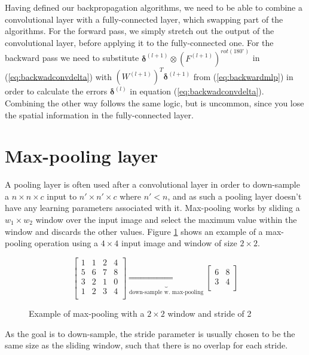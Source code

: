 Having defined our backpropagation algorithms, we need to be able to combine a
convolutional layer with a fully-connected layer, which swapping part of the
algorithms. For the forward pass, we simply stretch out the output of the
convolutional layer, before applying it to the fully-connected one. For the
backward pass we need to substitute  $\boldsymbol{\delta}^{(l+1)} \otimes
\left(F^{(l+1)}\right)^{rot(180^\circ)}$ in (\ref{eq:backwadconvdelta}) with
$({W}^{(l+1)})^T \boldsymbol{\delta}^{(l+1)}$ from (\ref{eq:backwardmlp}) in
order to calculate the errors $\boldsymbol{\delta}^{(l)}$ in equation
(\ref{eq:backwadconvdelta}). Combining the other way follows the same logic, but
is uncommon, since you lose the spatial information in the fully-connected
layer. 
\section{Max-pooling layer}
A pooling layer is often used after a convolutional layer in order to
down-sample a $n \times n \times c$ input to $n' \times n' \times c$ where $n' <
n$, and as such a pooling layer doesn't have any learning parameters associated
with it. Max-pooling works by sliding a $w_1 \times w_2$ window over the input
image and select the maximum value within the window and discards the other
values. Figure \ref{fig:maxpool} shows an example of a max-pooling operation
using a $4 \times4$ input image and window of size $2 \times 2$.
\begin{figure}[!hbtp]
	\begin{displaymath}
	\begin{bmatrix}
	1 & 1 & 2 & 4 \\ 
	5 & 6 & 7 & 8 \\ 
	3 & 2 & 1 & 0 \\ 
	1 & 2 & 3 & 4  \\  
	\end{bmatrix}
	\underbrace{\Rightarrow}_{\text{down-sample w. max-pooling}}
	\begin{bmatrix}
	6 & 8 \\ 
	3 & 4  \\  
	\end{bmatrix}
	\end{displaymath}
	\caption{Example of max-pooling with a $2\times2$ window and stride of 2}
	\label{fig:maxpool}
\end{figure} \newline 
As the goal is to down-sample, the stride parameter is usually chosen to be the
same size as the sliding window, such that there is no overlap for each stride. 
